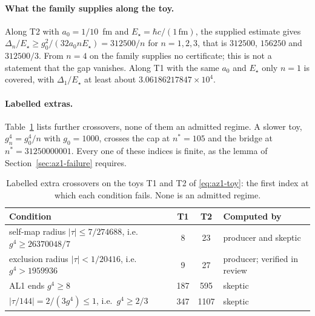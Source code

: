 \paragraph{What the family supplies along the toy.}
Along T2 with $a_0=1/10$~fm and $E_\star=\hbar c/(1\,\mathrm{fm})$, the
supplied estimate gives
$\Delta_n/E_\star\ge g_0^2/(32a_0nE_\star)=312500/n$ for $n=1,2,3$, that is
$312500$, $156250$ and $312500/3$. From $n=4$ on the family supplies no
certificate; this is not a statement that the gap vanishes. Along T1 with the
same $a_0$ and $E_\star$ only $n=1$ is covered, with $\Delta_1/E_\star$ at
least about $3.06186217847\times10^4$.

\paragraph{Labelled extras.}
Table~\ref{tab:az1-extras} lists further crossovers, none of them an admitted
regime. A slower toy, $g_n^4=g_0^4/n$ with $g_0=1000$, crosses the cap at
$n^*=105$ and the bridge at $n^*=31250000001$. Every one of these indices is
finite, as the lemma of Section~\ref{sec:az1-failure} requires.

\begin{table}[htbp]
\centering\small
\caption{Labelled extra crossovers on the toys T1 and T2 of
\eqref{eq:az1-toy}: the first index at which each condition fails. None is an
admitted regime.}
\label{tab:az1-extras}
\begin{tabular}{@{}lccl@{}}
\toprule
Condition & T1 & T2 & Computed by\\
\midrule
self-map radius $|\tau|\le7/274688$, i.e.\ $g^4\ge26370048/7$ & 8 & 23 & producer and skeptic\\
exclusion radius $|\tau|<1/20416$, i.e.\ $g^4>1959936$ & 9 & 27 & producer; verified in review\\
AL1 ends $g^4\ge8$ & 187 & 595 & skeptic\\
$|\tau/144|=2/(3g^4)\le1$, i.e.\ $g^4\ge2/3$ & 347 & 1107 & skeptic\\
\bottomrule
\end{tabular}
\end{table}

